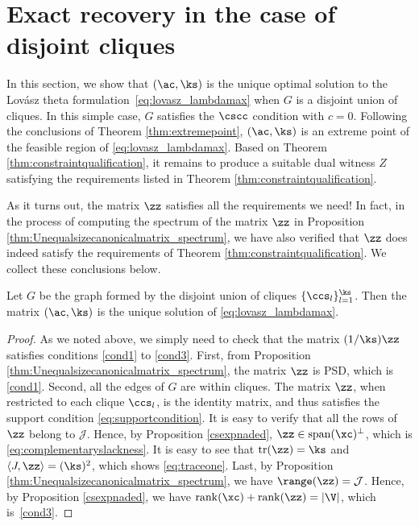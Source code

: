 \section{Exact recovery in the case of  disjoint cliques} \label{sec:disjointunion}

In this section, we show that $(\ac,\ks)$ is the unique optimal solution to the Lov\'asz theta formulation~\eqref{eq:lovasz_lambdamax} when $G$ is a disjoint union of cliques.  In this simple case, $G$ satisfies the $\cscc$ condition with $c=0$.  Following the conclusions of Theorem \ref{thm:extremepoint}, $(\ac,\ks)$ is an extreme point of the feasible region of \eqref{eq:lovasz_lambdamax}.  Based on Theorem \ref{thm:constraintqualification}, it remains to produce a suitable dual witness $Z$ satisfying the requirements listed in Theorem \ref{thm:constraintqualification}.

As it turns out, the matrix $\zz$ satisfies all the requirements we need!  In fact, in the process of computing the spectrum of the matrix $\zz$ in Proposition \ref{thm:Unequalsizecanonicalmatrix_spectrum}, we have also verified that $\zz$ does indeed satisfy the requirements of Theorem \ref{thm:constraintqualification}.  We collect these conclusions below.
 
\begin{theorem} \label{thm:disjointcliques_uniquerecovery}
Let $G$ be the graph formed by the disjoint union of cliques $\{\ccs_l\}_{l=1}^{\ks}$.  Then the matrix $(\ac,\ks)$ is the unique solution of \eqref{eq:lovasz_lambdamax}.
\end{theorem} 


\begin{proof}
As we noted above, we simply need to check that the matrix $(1/\ks)\zz$ satisfies conditions \eqref{cond1} to \eqref{cond3}.  First, from Proposition \ref{thm:Unequalsizecanonicalmatrix_spectrum}, the matrix $\zz$ is PSD, which is \eqref{cond1}.  Second, all the edges of $G$ are within cliques.  The matrix $\zz$, when restricted to each clique $\ccs_l$, is the identity matrix, and thus satisfies the support condition \eqref{eq:supportcondition}.  It is easy to verify that all the rows of $\zz$ belong to $\mathcal{J}$.  Hence, by Proposition \ref{csexpnaded}, $\zz\in {\rm span}(\xc)^\perp$, which is \eqref{eq:complementaryslackness}.  It is easy to see that $\mathrm{tr}(\zz) = \ks$ and $\langle J, \zz \rangle = (\ks)^2$, which shows  \eqref{eq:traceone}.  Last, by Proposition \ref{thm:Unequalsizecanonicalmatrix_spectrum}, we have $\range(\zz)=\mathcal{J}$.  Hence, by Proposition \ref{csexpnaded}, we have ${\rm rank}(\xc)+{\rm rank}(\zz)=|\V|$, which is~\eqref{cond3}.
\end{proof}

 